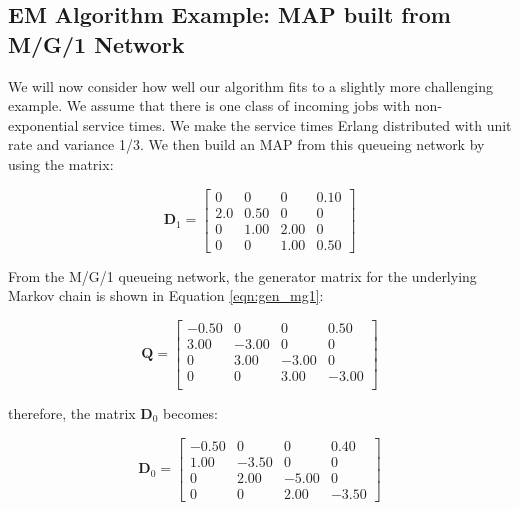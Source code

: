 \documentclass[a4paper,11pt,titlepage]{article}
\begin{document}
\subsection{EM Algorithm Example: MAP built from M/G/1 Network}

We will now consider how well our algorithm fits to a slightly more challenging example. We assume that there is one class of incoming jobs with non-exponential service times. We make the service times Erlang distributed with unit rate and variance 1/3. We then build an MAP from this queueing network by using the matrix:

\begin{equation}
    \mathbf{D}_1 = \begin{bmatrix}
     0 &   0  &  0  &  0.10 \\
     2.0  &  0.50  &  0  &  0 \\
     0 & 1.00 & 2.00 & 0 \\
     0 & 0 & 1.00 & 0.50
    \end{bmatrix}
\end{equation}

From the M/G/1 queueing network, the generator matrix for the underlying Markov chain is shown in Equation \ref{eqn:gen_mg1}:

\begin{equation}
    \mathbf{Q} = \begin{bmatrix}
-0.50    &     0    &     0  &  0.50 \\
3.00  & -3.00   &      0    &     0 \\
0  &  3.00  & -3.00   &     0 \\
0    &     0  &  3.00  & -3.00 \\
    \end{bmatrix}
    \label{eqn:gen_mg1}
\end{equation}

therefore, the matrix $\mathbf{D}_0$ becomes: 

\begin{equation}
    \mathbf{D}_0 = \begin{bmatrix}
-0.50    &     0     &    0   & 0.40 \\
1.00 &  -3.50  &      0    &     0 \\
0  &  2.00 &  -5.00    &     0 \\
0    &     0   & 2.00 &  -3.50
    \end{bmatrix}
\end{equation} \\
\end{document}
